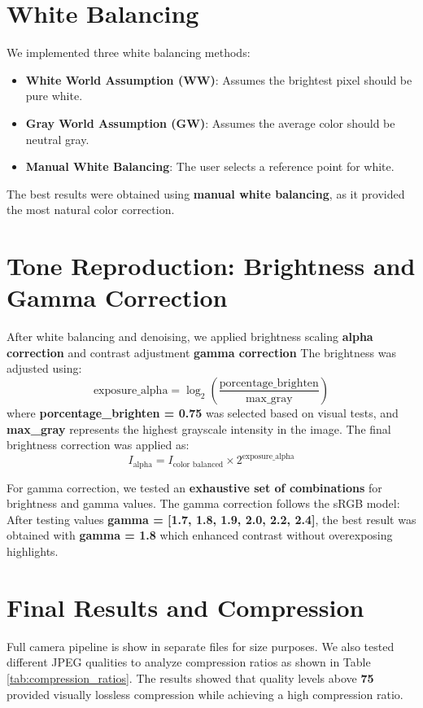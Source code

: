 \documentclass[a4paper,10pt]{article}
\begin{document}
\section{White Balancing}
We implemented three white balancing methods:
\begin{itemize}
    \item \textbf{White World Assumption (WW)}: Assumes the brightest pixel should be pure white.
    \item \textbf{Gray World Assumption (GW)}: Assumes the average color should be neutral gray.
    \item \textbf{Manual White Balancing}: The user selects a reference point for white.
\end{itemize}
The best results were obtained using \textbf{manual white balancing}, as it provided the most natural color correction.

\section{Tone Reproduction: Brightness and Gamma Correction}
After white balancing and denoising, we applied brightness scaling \textbf{alpha correction} and contrast adjustment \textbf{gamma correction} The brightness was adjusted using:
\begin{equation}
\text{exposure\_alpha} = \log_2\left(\frac{\text{porcentage\_brighten}}{\text{max\_gray}}\right)
\end{equation}
where \textbf{porcentage\_brighten = 0.75} was selected based on visual tests, and \textbf{max\_gray} represents the highest grayscale intensity in the image. The final brightness correction was applied as:
\begin{equation}
I_{\text{alpha}} = I_{\text{color balanced}} \times 2^{\text{exposure\_alpha}}
\end{equation}

For gamma correction, we tested an \textbf{exhaustive set of combinations} for brightness and gamma values. The gamma correction follows the sRGB model:
After testing values \textbf{gamma = [1.7, 1.8, 1.9, 2.0, 2.2, 2.4]}, the best result was obtained with \textbf{gamma = 1.8} which enhanced contrast without overexposing highlights.

\section{Final Results and Compression}
Full camera pipeline is show in separate files for size purposes. We also tested different JPEG qualities to analyze 
compression ratios as shown in Table \ref{tab:compression_ratios}.
The results showed that quality levels above \textbf{75} provided visually lossless compression while achieving a high compression ratio.
\end{document}

